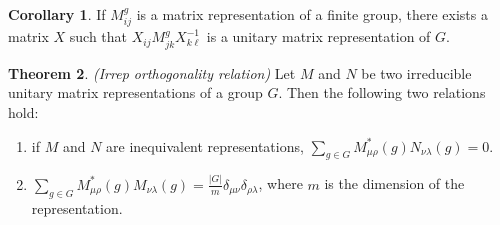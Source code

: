 \documentclass[12pt, letterpaper]{article}
\theoremstyle{definition} %
\newtheorem{thm}{Theorem}[section] %
\newtheorem{cor}[thm]{Corollary}
\begin{document}
\begin{cor}
  If $M^g_{ij}$ is a matrix representation of a finite group, there exists a matrix $X$ such that $X_{ij} M^g_{jk} X^{-1}_{k\ell}$ is a unitary matrix representation 
  of $G$.
\end{cor}


\begin{thm} \emph{(Irrep orthogonality relation)}
  Let $M$ and $N$ be two irreducible unitary matrix representations of a group $G$. Then the following two relations hold:
  
  \begin{enumerate}
    \item if $M$ and $N$ are inequivalent representations, $\sum_{g\in G} M^*_{\mu \rho}(g) N_{\nu \lambda}(g)=0$.
    \item $\sum_{g\in G} M^*_{\mu \rho}(g) M_{\nu \lambda}(g)=\frac{|G|}{m} \delta_{\mu\nu}\delta_{\rho\lambda}$, where $m$ is the dimension of the representation.
  \end{enumerate}
\end{thm}
\end{document}
